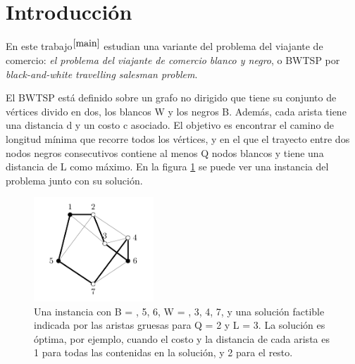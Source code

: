\documentclass[10pt, a4paper]{article}
\begin{document}




\maketitle

\tableofcontents

\newpage

\section{Introducción}

En este trabajo$^{\cite{main}}$ estudian una variante del problema del viajante de comercio: \textit{el problema del viajante de comercio blanco y negro}, o BWTSP por \textit{black-and-white travelling salesman problem}.

El BWTSP está definido sobre un grafo no dirigido que tiene su conjunto de vértices divido en dos, los blancos W y los negros B. Además, cada arista tiene una distancia d y un costo c asociado. El objetivo es encontrar el camino de longitud mínima que recorre todos los vértices, y en el que el trayecto entre dos nodos negros consecutivos contiene al menos Q nodos blancos y tiene una distancia de L como máximo. En la figura \ref{fig:ejemplo_0} se puede ver una instancia del problema junto con su solución.

\begin{figure}[H]
    \centering
    \includegraphics[width=0.4\textwidth]{ejemplo_0.png}
    \caption{Una instancia con B = , 5, 6\textbraceright, W = , 3, 4, 7\textbraceright, y una solución factible indicada por las aristas gruesas para Q = 2 y L = 3. La solución es óptima, por ejemplo, cuando el costo y la distancia de cada arista es 1 para todas las contenidas en la solución, y 2 para el resto.}
    \label{fig:ejemplo_0}
\end{figure}
\end{document}
